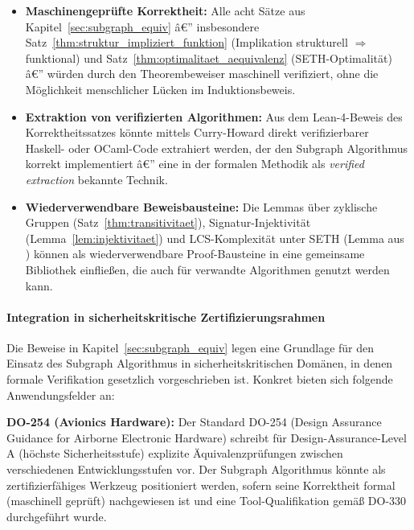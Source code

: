 ﻿\documentclass[12pt,a4paper]{report}
\begin{document}
\begin{itemize}
    \item \textbf{Maschinengeprüfte Korrektheit:} Alle acht Sätze aus
          Kapitel~\ref{sec:subgraph_equiv} â€” insbesondere Satz~\ref{thm:struktur_impliziert_funktion}
          (Implikation strukturell $\Rightarrow$ funktional) und
          Satz~\ref{thm:optimalitaet_aequivalenz} (SETH-Optimalität) â€” würden durch
          den Theorembeweiser maschinell verifiziert, ohne die Möglichkeit menschlicher
          Lücken im Induktionsbeweis.
    \item \textbf{Extraktion von verifizierten Algorithmen:} Aus dem Lean-4-Beweis
          des Korrektheitssatzes könnte mittels Curry-Howard direkt verifizierbarer
          Haskell- oder OCaml-Code extrahiert werden, der den Subgraph Algorithmus
          korrekt implementiert â€” eine in der formalen Methodik als \textit{verified
          extraction} bekannte Technik.
    \item \textbf{Wiederverwendbare Beweisbausteine:} Die Lemmas über zyklische Gruppen
          (Satz~\ref{thm:transitivitaet}), Signatur-Injektivität (Lemma~\ref{lem:injektivitaet})
          und LCS-Komplexität unter SETH (Lemma aus \cite{subgraph2026}) können als
          wiederverwendbare Proof-Bausteine in eine gemeinsame Bibliothek einfließen,
          die auch für verwandte Algorithmen genutzt werden kann.
\end{itemize}

\paragraph{Integration in sicherheitskritische Zertifizierungsrahmen}

Die Beweise in Kapitel~\ref{sec:subgraph_equiv} legen eine Grundlage für den Einsatz
des Subgraph Algorithmus in sicherheitskritischen Domänen, in denen formale
Verifikation gesetzlich vorgeschrieben ist. Konkret bieten sich folgende Anwendungsfelder an:

\textbf{DO-254 (Avionics Hardware):} Der Standard DO-254 (Design Assurance Guidance for
Airborne Electronic Hardware) schreibt für Design-Assurance-Level A (höchste Sicherheitsstufe)
explizite Äquivalenzprüfungen zwischen verschiedenen Entwicklungsstufen vor. Der
Subgraph Algorithmus könnte als zertifizierfähiges Werkzeug positioniert werden, sofern
seine Korrektheit formal (maschinell geprüft) nachgewiesen ist und eine
Tool-Qualifikation gemäß DO-330 durchgeführt wurde.
\end{document}
